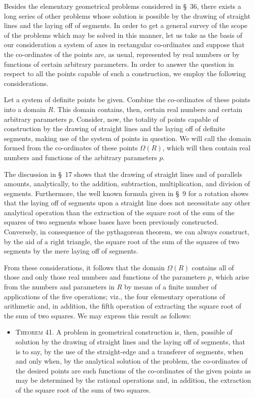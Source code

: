 \documentclass[11pt,oneside]{book}
\begin{document}
Besides the elementary geometrical problems considered
in \S~36, there exists a long series of other
problems whose solution is possible by the drawing
of straight lines and the laying off of segments. In
order to get a general survey of the scope of the problems
which may be solved in this manner, let us take
as the basis of our consideration a system of axes in
rectangular co-ordinates and suppose that the co-ordinates
of the points are, as usual, represented by real
numbers or by functions of certain arbitrary parameters.
In order to answer the question in respect to
all the points capable of such a construction, we employ
the following considerations.

Let a system of definite points be given. Combine
the co-ordinates of these points into a domain $R$.
This domain contains, then, certain real numbers and
certain arbitrary parameters $p$. Consider, now, the
totality of points capable of construction by the drawing
of straight lines and the laying off of definite segments,
making use of the system of points in question.
We will call the domain formed from the co-ordinates
of these points $\Omega(R)$, which will then contain real
numbers and functions of the arbitrary parameters $p$.

The discussion in \S~17 shows that the drawing of
straight lines and of parallels amounts, analytically,
to the addition, subtraction, multiplication, and division
of segments. Furthermore, the well known formula
given in \S~9 for a rotation shows that the laying
off of segments upon a straight line does not necessitate
any other analytical operation than the extraction
of the square root of the sum of the squares of two
segments whose bases have been previously constructed.
Conversely, in consequence of the pythagorean
theorem, we can always construct, by the aid
of a right triangle, the square root of the sum of the
squares of two segments by the mere laying off of
segments.

From these considerations, it follows that the domain
$\Omega(R)$ contains all of those and only those real
numbers and functions of the parameters $p$, which arise
from the numbers and parameters in $R$ by means of a
finite number of applications of the five operations;
viz., the four elementary operations of arithmetic and,
in addition, the fifth operation of extracting the square
root of the sum of two squares. We may express this
result as follows:

\begin{itemize}
\item[]{\scshape Theorem 41.} A problem in geometrical construction
is, then, possible of solution by the drawing
of straight lines and the laying off of segments,
that is to say, by the use of the straight-edge
and a transferer of segments, when and only
when, by the analytical solution of the problem,
the co-ordinates of the desired points are
such functions of the co-ordinates of the given
points as may be determined by the rational
operations and, in addition, the extraction of
the square root of the sum of two squares.
\end{itemize}
\end{document}
